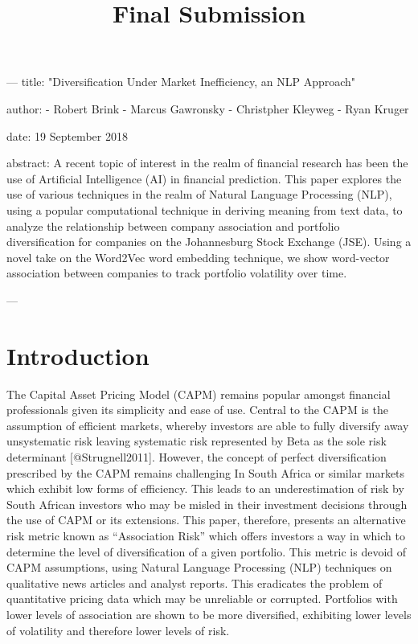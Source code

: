 \documentclass[11pt]{article}
\title{Final Submission}
\begin{document}
    
    
    \maketitle
    
    

    ---
title: "Diversification Under Market Inefficiency, an NLP Approach"

author:
- Robert Brink
- Marcus Gawronsky
- Christpher Kleyweg
- Ryan Kruger

date: 19 September 2018

abstract: A recent topic of interest in the realm of financial research has been the use of Artificial Intelligence (AI) in financial prediction. This paper explores the use of various techniques in the realm of Natural Language Processing (NLP), using a popular computational technique in deriving meaning from text data, to analyze the relationship between company association and portfolio diversification for companies on the Johannesburg Stock Exchange (JSE). Using a novel take on the Word2Vec word embedding technique, we show word-vector association between companies to track portfolio volatility over time. 

---  
    \newpage

\hypertarget{introduction}{%
\section{Introduction}\label{introduction}}

The Capital Asset Pricing Model (CAPM) remains popular amongst financial
professionals given its simplicity and ease of use. Central to the CAPM
is the assumption of efficient markets, whereby investors are able to
fully diversify away unsystematic risk leaving systematic risk
represented by Beta as the sole risk determinant {[}@Strugnell2011{]}.
However, the concept of perfect diversification prescribed by the CAPM
remains challenging In South Africa or similar markets which exhibit low
forms of efficiency. This leads to an underestimation of risk by South
African investors who may be misled in their investment decisions
through the use of CAPM or its extensions. This paper, therefore,
presents an alternative risk metric known as ``Association Risk'' which
offers investors a way in which to determine the level of
diversification of a given portfolio. This metric is devoid of CAPM
assumptions, using Natural Language Processing (NLP) techniques on
qualitative news articles and analyst reports. This eradicates the
problem of quantitative pricing data which may be unreliable or
corrupted. Portfolios with lower levels of association are shown to be
more diversified, exhibiting lower levels of volatility and therefore
lower levels of risk.
\end{document}
